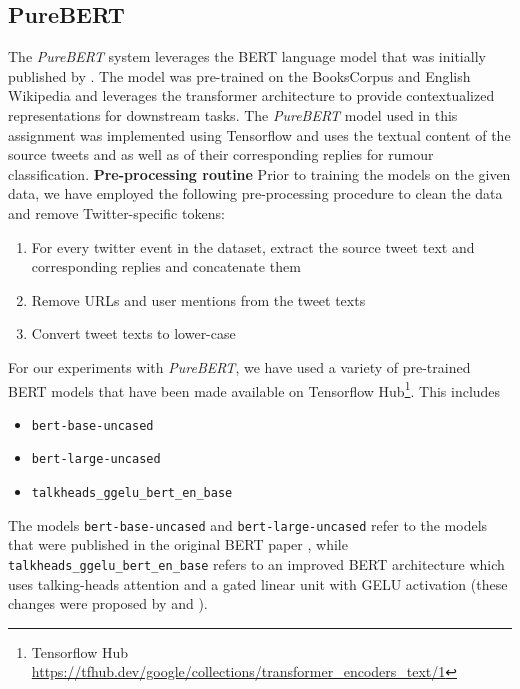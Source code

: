 \documentclass[11pt,a4paper]{article}
\begin{document}
\subsection{PureBERT}
\label{sec:purebert}
The \textit{PureBERT} system leverages the BERT language model that was initially published by \citet{RN688}. The model was pre-trained on the BooksCorpus \citep{RN689} and English Wikipedia and leverages the transformer architecture to provide contextualized representations for downstream tasks.
\newline
The \textit{PureBERT} model used in this assignment was implemented using Tensorflow \citep{RN681} and uses the textual content of the source tweets and as well as of their corresponding replies for rumour classification. 
\newline
\newline
\textbf{Pre-processing routine}
\newline
Prior to training the models on the given data, we have employed the following pre-processing procedure to clean the data and remove Twitter-specific tokens:
\begin{enumerate}[noitemsep]
    \item For every twitter event in the dataset, extract the source tweet text and corresponding replies and concatenate them 
    \item Remove URLs and user mentions from the tweet texts
    \item Convert tweet texts to lower-case
\end{enumerate}
For our experiments with \textit{PureBERT}, we have used a variety of pre-trained BERT models that have been made available on Tensorflow Hub\footnote{Tensorflow Hub \url{https://tfhub.dev/google/collections/transformer_encoders_text/1}}. This includes
\begin{itemize}[noitemsep,topsep=2pt,parsep=0pt,partopsep=0pt]
    \item \verb|bert-base-uncased|
    \item \verb|bert-large-uncased|
    \item \verb|talkheads_ggelu_bert_en_base|
\end{itemize}
The models \verb|bert-base-uncased| and \verb|bert-large-uncased| refer to the models that were published in the original BERT paper \citep{RN688}, while \verb|talkheads_ggelu_bert_en_base| refers to an improved BERT architecture which uses talking-heads attention and a gated linear unit with GELU activation (these changes were proposed by 
\citet{RN685} and \citet{RN686}).
\end{document}
